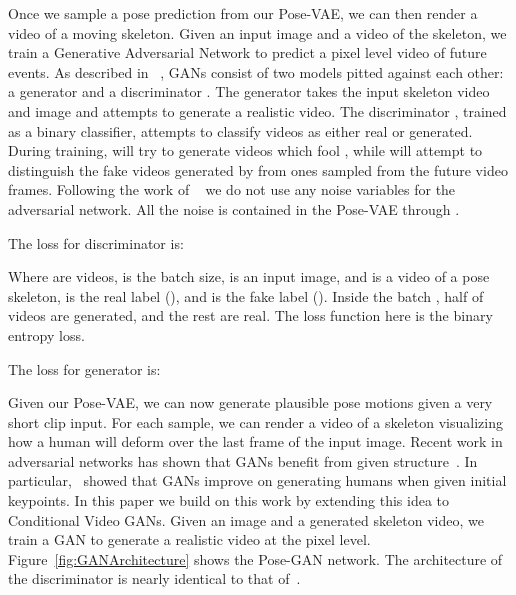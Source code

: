  Once we sample a pose prediction from our Pose-VAE, we can then render a video of a moving skeleton. Given an input image and a
video of the skeleton, we train a Generative Adversarial Network to predict a pixel level video of future events. As described in ~\cite{Wang16}, GANs consist of two models pitted against each other: a generator  and a discriminator . The generator  takes the input skeleton video and image and attempts to generate a realistic video. The discriminator , trained as a binary classifier, attempts to classify videos as either real or generated. During training,  will try to generate videos which fool , while  will attempt to distinguish the fake videos generated by  from ones sampled from the future video frames.
Following the work of ~\cite{Isola16, Vondrick16} we do not use any noise variables for the adversarial network. All the noise is contained in the Pose-VAE through .


The loss for discriminator  is:

\vspace{-.3cm}

\vspace{-.3cm}

Where  are videos,  is the batch size,  is an input image, and  is a video of a pose skeleton,  is the real label (), and  is the fake label (). Inside the batch , half of videos  are generated, and the rest are real. The loss function  here is the binary entropy loss. 




The loss for generator  is:

\vspace{-.5cm}

\vspace{-.5cm}

Given our Pose-VAE, we can now generate plausible pose motions given a very short clip input. For each sample, we can render a video of a skeleton visualizing how a human will deform over the last frame of the input image. Recent work in adversarial networks has shown that GANs benefit from given structure~\cite{Isola16, Pathak16, Reed16}. In particular,~\cite{Reed16} showed that GANs improve on generating humans when given initial keypoints. In this paper we build on this work by extending this idea to Conditional Video GANs. Given an image and a generated skeleton video, we train a GAN to generate a realistic video at the pixel level. Figure~\ref{fig:GANArchitecture} shows the Pose-GAN network. The architecture of the discriminator  is nearly identical to that of~\cite{Vondrick16}. 

